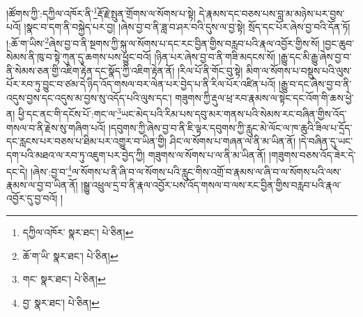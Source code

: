 །ཚོགས་ཀྱི་:དཀྱིལ་འཁོར་ནི་\footnote{དཀྱིལ་འཁོར་  སྣར་ཐང་།  པེ་ཅིན། }རྡོ་རྗེ་སྤུན་གྲོགས་ལ་སོགས་པ་སྟེ། དེ་རྣམས་དང་བཅས་པས་བླ་མ་མཉེས་པར་བྱས་པའོ། །སྣང་བ་དག་ནི་བསྐྱེད་པར་བྱ། །ཞེས་བྱ་བ་ནི་ཟླ་བ་ཤར་བའི་དུས་ལ་བྱ་སྟེ། སྲོད་དང་པོར་ཞེས་བྱ་བའི་དོན་ཏོ། །:ཆོ་ག་ཡིས་\footnote{ཆོ་ག་ཡི་  སྣར་ཐང་།  པེ་ཅིན། }ཞེས་བྱ་བ་ནི་སྔགས་ཀྱི་སྐུ་ལ་སོགས་པ་དང་རང་བྱིན་གྱིས་བརླབ་པའི་རྣལ་འབྱོར་གྱིས་སོ། །བྱང་ཆུབ་སེམས་ནི་ཁུ་བ་སྟེ་ཀུན་དུ་ཆགས་པས་ཕྱུང་བའོ། །ཉིན་པར་ཞེས་བྱ་བ་ནི་གཟི་མདངས་སོ། །རྒྱུ་དང་མི་རྒྱུ་ཞེས་བྱ་བ་ནི་སེམས་ཅན་གྱི་འཇིག་རྟེན་དང་སྣོད་ཀྱི་འཇིག་རྟེན་ནོ། །རིལ་པོ་ནི་གོང་བུ་སྟེ། མིག་ལ་སོགས་པ་བསྡུས་པའི་ལུས་པོར་རབ་ཏུ་བྱུང་བ་ཙམ་དེ་ཉིད་འོད་གསལ་བར་ལེན་པར་བྱེད་པ་ནི་རིལ་པོར་འཛིན་པའོ། །རྒྱུ་བ་དང་ཞེས་བྱ་བ་ནི་འདུས་བྱས་དང་འདུས་མ་བྱས་སུ་འདོད་པའི་ལུས་དང་། གཟུགས་ཀྱི་རྡུལ་ཕྲ་རབ་རྣམས་ལ་སྟེང་དང་འོག་གི་ཆས་ཕྱེ་ན། ཕྱི་དང་ནང་གི་དངོས་པོ་:གང་ལ་\footnote{གང་  སྣར་ཐང་།  པེ་ཅིན། }ཡང་མེད་པའི་རིམ་པས་དབུ་མར་གནས་པའི་སེམས་རང་བཞིན་གྱིས་འོད་གསལ་བ་ནི་རྗེས་སུ་གཞིག་པའོ། །དབུགས་ཀྱི་ཞེས་བྱ་བ་ནི་ཇི་ལྟར་དབུགས་ཀྱི་རླུང་མེ་ལོང་ལ་ཁ་ཆུའི་ཟིལ་པ་དྲོད་དང་རླངས་པར་བཅས་པ་ཐིམ་པར་འགྱུར་བ་ཡིན་གྱི། ཤིང་ལ་སོགས་པ་གཞན་ལ་ནི་མ་ཡིན་ནོ། །དེ་བཞིན་དུ་ཡང་དག་པའི་མཐའ་ལ་རབ་ཏུ་འཇུག་པར་བྱེད་ཀྱི། གཟུགས་ལ་སོགས་པ་ལ་ནི་མ་ཡིན་ནོ། །གཟུགས་བཅས་འོད་ཟེར་དེ་དང་དེ། །ཞེས་:བྱ་བ་\footnote{བྱ་  སྣར་ཐང་།  པེ་ཅིན། }ལ་སོགས་པ་ནི་ཞི་བ་ལ་སོགས་པའི་རླུང་གིས་འགྲོ་བ་རྣམས་ལ་ཞི་བ་ལ་སོགས་པའི་ལས་རྣམས་ལ་བྱ་བ་ཡིན་ནོ། །སྒྱུ་འཕྲུལ་དྲ་བ་ནི་རྣལ་འབྱོར་པས་འོད་གསལ་བ་ལས་རང་བྱིན་གྱིས་བརླབ་པའི་རྣལ་འབྱོར་དུ་བྱ་བའོ། །
